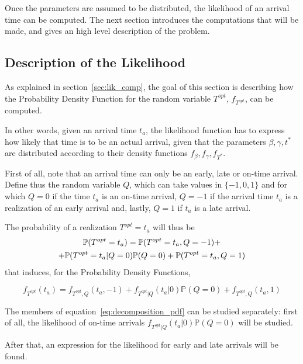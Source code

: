 Once the parameters are assumed to be distributed,
the likelihood of an arrival time can be computed.
The next section introduces the computations that will be made,
and gives an high level description of the problem.

\subsection{Description of the Likelihood}
\label{sec:descr-likel}

As explained in section~\ref{sec:lik_comp},
the goal of this section is describing how the Probability Density Function for the random variable \(T^{opt}\), \(f_{T^{opt}}\), can be computed.

In other words, given an arrival time \(t_a\),
the likelihood function has to express how likely that time is to be an actual arrival,
given that the parameters \(\beta, \gamma, t^*\) are distributed according to their density functions \(f_\beta, f_\gamma, f_{T^*}\).

First of all, note that an arrival time can only be an early, late or on-time arrival.
Define thus the random variable \(Q\),
which can take values in \(\{-1, 0, 1\}\) and for which
\(Q = 0\) if the time \(t_a\) is an on-time arrival,
\(Q = -1\) if the arrival time \(t_a\) is a realization of an early arrival and, lastly,
\(Q = 1\) if \(t_a\) is a late arrival.

The probability of a realization \(T^{opt} = t_a\) will thus be
\begin{multline}
  \label{eq:decomposition_prob}
  \mathbb{P}(T^{opt} = t_a) = \mathbb{P}(T^{opt} = t_a, Q = -1) + \\
  + \mathbb{P}(T^{opt} = t_a | Q = 0)\mathbb{P}(Q = 0)
  + \mathbb{P}(T^{opt} = t_a, Q = 1)
\end{multline}
that induces, for the Probability Density Functions,

\begin{equation}
  \label{eq:decomposition_pdf}
  f_{T^{opt}}(t_a) = f_{T^{opt}, Q}(t_a, -1)
  + f_{T^{opt} | Q}(t_a | 0)\mathbb{P}(Q = 0) + f_{T^{opt}, Q}(t_a, 1)
\end{equation}

The members of equation~\eqref{eq:decomposition_pdf} can be studied separately:
first of all,
the likelihood of on-time arrivals \(f_{T^{opt} | Q}(t_a | 0)\mathbb{P}(Q = 0)\) will be studied.

After that, an expression for the likelihood for early and late arrivals will be found.

